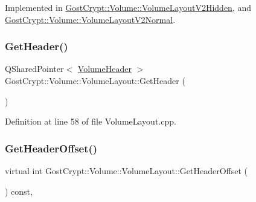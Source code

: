 Implemented in \hyperlink{class_gost_crypt_1_1_volume_1_1_volume_layout_v2_hidden_ad38f4c055cdb8000bd193fdaa23a6828}{Gost\+Crypt\+::\+Volume\+::\+Volume\+Layout\+V2\+Hidden}, and \hyperlink{class_gost_crypt_1_1_volume_1_1_volume_layout_v2_normal_a936a198ca9967611d4d40cc97474c310}{Gost\+Crypt\+::\+Volume\+::\+Volume\+Layout\+V2\+Normal}.

\mbox{\label{class_gost_crypt_1_1_volume_1_1_volume_layout_a97d7492068bd039d151c0ba2e78c3f2e}} 
\subsubsection{\texorpdfstring{Get\+Header()}{GetHeader()}}
{\footnotesize\ttfamily Q\+Shared\+Pointer$<$ \hyperlink{class_gost_crypt_1_1_volume_1_1_volume_header}{Volume\+Header} $>$ Gost\+Crypt\+::\+Volume\+::\+Volume\+Layout\+::\+Get\+Header (\begin{DoxyParamCaption}{ }\end{DoxyParamCaption})\hspace{0.3cm}{\ttfamily [virtual]}}



Definition at line 58 of file Volume\+Layout.\+cpp.

\mbox{\label{class_gost_crypt_1_1_volume_1_1_volume_layout_a4ee86fb93d04ee30404d40209f7625de}} 
\subsubsection{\texorpdfstring{Get\+Header\+Offset()}{GetHeaderOffset()}}
{\footnotesize\ttfamily virtual int Gost\+Crypt\+::\+Volume\+::\+Volume\+Layout\+::\+Get\+Header\+Offset (\begin{DoxyParamCaption}{ }\end{DoxyParamCaption}) const\hspace{0.3cm}{\ttfamily [inline]}, {\ttfamily [virtual]}}



